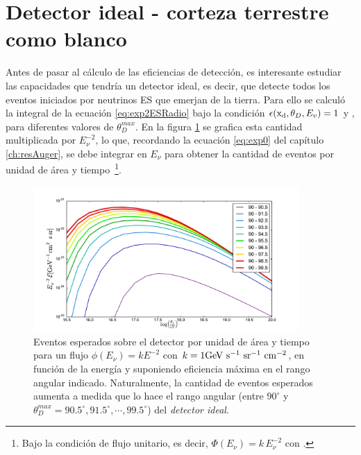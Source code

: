 \section{Detector ideal - corteza terrestre como blanco}
\label{sc:idealRadio}
	Antes de pasar al c\'alculo de las eficiencias de detecci\'on, es interesante estudiar las capacidades que tendr\'ia un detector ideal, es decir, que detecte todos los eventos iniciados por neutrinos ES que emerjan de la tierra.
	Para ello se calcul\'o la integral de la ecuaci\'on \ref{eq:exp2ESRadio} bajo la condici\'on $\epsilon ({\rm x_d},\theta_D,E_v) = 1$ y , para diferentes valores de $\theta_D^{max}$.
	En la figura \ref{fig:exposuresFluxThetas} se grafica esta cantidad multiplicada por $E_\nu^{-2}$, lo que, recordando la ecuaci\'on \ref{eq:exp0} del cap\'itulo \ref{ch:resAuger}, se debe integrar en $E_\nu$ para obtener la cantidad de eventos por unidad de \'area y tiempo~\footnote{Bajo la condici\'on de flujo unitario, es decir, $\Phi(E_{\nu})=k\,E_\nu^{-2}$ con .}.
%
	\begin{figure}[h!]
		\begin{center}
			\includegraphics[width=0.9\textwidth]{fig/resultadosRadio/exposureFullEff_thetas}
			\caption{\label{fig:exposuresFluxThetas} Eventos esperados sobre el detector por unidad de \'area y tiempo para un flujo $\phi(E_\nu)= k E^{-2}$ con $k=1{\rm GeV\ s^{-1}\ sr^{-1}\ cm^{-2}}$, en funci\'on de la energ\'ia y suponiendo eficiencia m\'axima en el rango angular indicado.
			Naturalmente, la cantidad de eventos esperados aumenta a medida que lo hace el rango angular (entre $90^\circ$ y $\theta_D^{max}=90.5^\circ,91.5^\circ,\cdots,99.5^\circ$) del \emph{detector ideal}.
			}
		\end{center}
	\end{figure}
	
